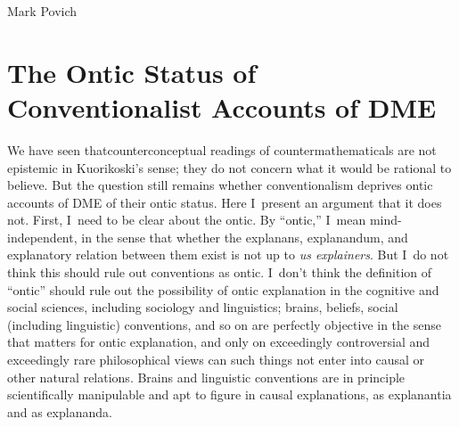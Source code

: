 \begin{artengenv}{Mark Povich}
\section{The Ontic Status of Conventionalist Accounts of DME}
We have seen thatcounterconceptual readings of countermathematicals are not epistemic in Kuorikoski's sense; they do not concern what it would be rational to believe. But the question still remains whether conventionalism deprives ontic accounts of DME of their ontic status. Here I~present an argument that it does not. First, I~need to be clear about the ontic. By ``ontic,'' I~mean mind-independent, in the sense that whether the explanans, explanandum, and explanatory relation between them exist is not up to \textit{us explainers}. But I~do not think this should rule out conventions as ontic. I~don't think the definition of ``ontic'' should rule out the possibility of ontic explanation in the cognitive and social sciences, including sociology and linguistics; brains, beliefs, social (including linguistic) conventions, and so on are perfectly objective in the sense that matters for ontic explanation, and only on exceedingly controversial and exceedingly rare philosophical views can such things not enter into causal or other natural relations. Brains and linguistic conventions are in principle scientifically manipulable and apt to figure in causal explanations, as explanantia and as explananda.


\end{artengenv}
